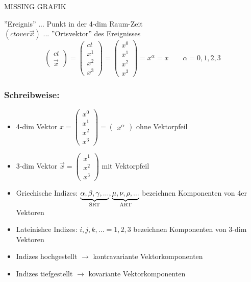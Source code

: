 \documentclass[a4paper, 11pt]{article}
\numberwithin{equation}{section}
\begin{document}
MISSING GRAFIK

''Ereignis'' ... Punkt in der 4-dim Raum-Zeit\\
$\left(ct over \vec{x}\right) $ ... ''Ortsvektor'' des Ereignisses
\begin{equation}
\begin{pmatrix}
ct \\
\vec{x}
\end{pmatrix} = \begin{pmatrix}
ct \\ x^1 \\ x^2 \\ x^3
\end{pmatrix} = \begin{pmatrix}
x^0 \\ x^1 \\ x^2 \\ x^3
\end{pmatrix} = x^\alpha  = x \qquad \alpha = 0,1,2,3
\end{equation} 
 
\subsubsection*{Schreibweise:}
\begin{itemize}
\item 4-dim Vektor $x = \begin{pmatrix}
x^0 \\ x^1 \\ x^2 \\x^3 \end{pmatrix} = \begin{pmatrix}
x^\alpha
\end{pmatrix}$ ohne Vektorpfeil
\item 3-dim Vektor $\vec{x} = \begin{pmatrix}
x^1 \\x^2 \\ x^3
\end{pmatrix}$ mit Vektorpfeil
\item Griechische Indizes: $\underbrace{\alpha, \beta, \gamma, ...}_{\mathclap{\text{SRT}}} , \underbrace{\mu, \nu, \rho, ...}_{\mathclap{\text{ART}}}$ bezeichnen Komponenten von 4er Vektoren 
\item Lateinishce Indizes: $i,j,k,... = 1,2,3$ bezeichnen Komponenten von 3-dim Vektoren
\item Indizes hochgestellt $\rightarrow$ kontravariante Vektorkomponenten
\item Indizes tiefgestellt $\rightarrow$ kovariante Vektorkomponenten
\end{itemize}
\end{document}
